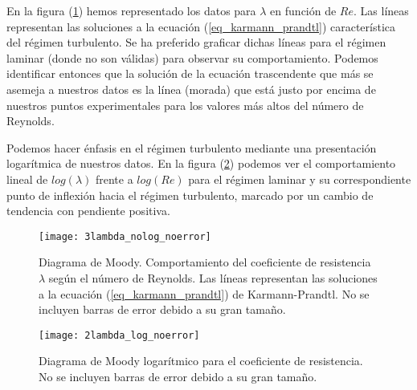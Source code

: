 En la figura (\ref{figure_lambda}) hemos representado los datos para $\lambda$ en función de $Re$. Las líneas representan las soluciones a la ecuación (\ref{eq_karmann_prandtl}) característica del régimen turbulento. Se ha preferido graficar dichas líneas para el régimen laminar (donde no son válidas) para observar su comportamiento. Podemos identificar entonces que la solución de la ecuación trascendente que más se asemeja a nuestros datos es la línea (morada) que está justo por encima de nuestros puntos experimentales para los valores más altos del número de Reynolds.

Podemos hacer énfasis en el régimen turbulento mediante una presentación logarítmica de nuestros datos. En la figura (\ref{figure_lambda_log}) podemos ver el comportamiento lineal de $log (\lambda)$ frente a $log (Re)$ para el régimen laminar y su correspondiente punto de inflexión hacia el régimen turbulento, marcado por un cambio de tendencia con pendiente positiva.

\begin{figure}[t]
	\texttt{[image: 3lambda\_nolog\_noerror]}
	\caption{Diagrama de Moody. Comportamiento del coeficiente de resistencia $\lambda$ según el número de Reynolds. Las líneas representan las soluciones a la ecuación (\ref{eq_karmann_prandtl}) de Karmann-Prandtl. No se incluyen barras de error debido a su gran tamaño.}
	\label{figure_lambda}
\end{figure}

\begin{figure}[t]
	\texttt{[image: 2lambda\_log\_noerror]}
	\caption{Diagrama de Moody logarítmico para el coeficiente de resistencia. No se incluyen barras de error debido a su gran tamaño.}
	\label{figure_lambda_log}
\end{figure}